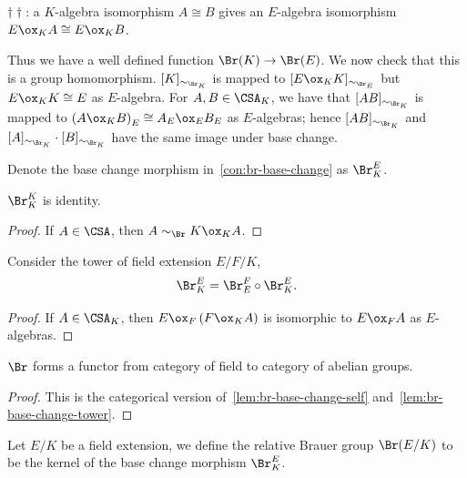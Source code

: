 \begin{construction}
   \noindent$\dagger\!\dagger$: a $K$-algebra isomorphism $A\cong B$ gives an $E$-algebra isomorphism $E\ox_{K}A \cong E\ox_{K} B$.

   Thus we have a well defined function $\Br(K)\to\Br(E)$. We now check that this is a group homomorphism. $[K]_{\sim_{\Br_{K}}}$ is mapped to $[E\ox_{K}K]_{\sim_{\Br_{E}}}$ but $E\ox_{K}K\cong E$ as $E$-algebra. For $A, B\in\CSA_{K}$, we have that $[AB]_{\sim_{\Br_{K}}}$ is mapped to $\left(A\ox_{K}B\right)_{E}\cong A_{E}\ox_{E} B_{E}$ as $E$-algebras; hence $[AB]_{\sim_{\Br_{K}}}$ and $[A]_{\sim_{\Br_{K}}}\cdot[B]_{\sim_{\Br_{K}}}$ have the same image under base change.
   \leanok
 \end{construction}
 Denote the base change morphism in~\cref{con:br-base-change} as $\Br_{K}^{E}$.
 \begin{lemma}\label{lem:br-base-change-self}
   $\Br_{K}^{K}$ is identity.
   \leanok
 \end{lemma}
 \begin{proof}
   If $A\in\CSA$, then $A\sim_{\Br}K\ox_{K}A$.
 \end{proof}

 \begin{lemma}\label{lem:br-base-change-tower}
   Consider the tower of field extension $E/F/K$,
   \[
     \Br_{K}^{E} = \Br_{E}^{F}\circ\Br_{K}^{E}.
   \]
 \end{lemma}

 \begin{proof}
   If $A\in\CSA_{K}$, then $E\ox_{F}\left(F\ox_{K}A\right)$ is isomorphic to $E \ox_{F} A$ as $E$-algebras.
   \leanok
 \end{proof}

 \begin{corollary}
   $\Br$ forms a functor from category of field to category of abelian groups.
   \leanok
 \end{corollary}
 \begin{proof}
   This is the categorical version of~\cref{lem:br-base-change-self} and~\cref{lem:br-base-change-tower}.
 \end{proof}

 \begin{definition}
   Let $E/K$ be a field extension, we define the relative Brauer group $\Br(E/K)$ to be the kernel of the base change morphism $\Br_{K}^{E}$.
   \leanok
 \end{definition}

